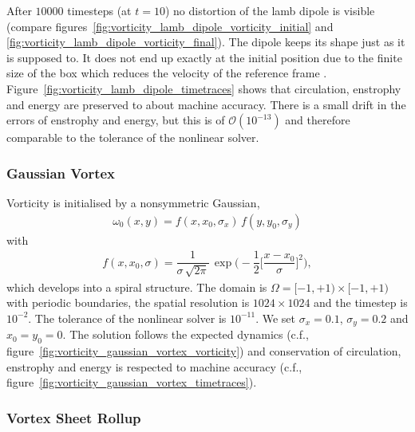 \documentclass[12pt,a4paper,reqno]{article}
\begin{document}
After $10000$ timesteps (at $t=10$) no distortion of the lamb dipole is visible (compare figures~\ref{fig:vorticity_lamb_dipole_vorticity_initial} and \ref{fig:vorticity_lamb_dipole_vorticity_final}). The dipole keeps its shape just as it is supposed to. It does not end up exactly at the initial position due to the finite size of the box which reduces the velocity of the reference frame \cite[section IV.B]{NielsenRasmussen:1997}. 
 Figure~\ref{fig:vorticity_lamb_dipole_timetraces} shows that circulation, enstrophy and energy are preserved to about machine accuracy. There is a small drift in the errors of enstrophy and energy, but this is of $\mathcal{O} (10^{-13})$ and therefore comparable to the tolerance of the nonlinear solver.

\subsubsection*{Gaussian Vortex}

Vorticity is initialised by a nonsymmetric Gaussian,
\begin{align}
\omega_{0} (x,y) = f(x, x_{0}, \sigma_{x}) \, f(y, y_{0}, \sigma_{y})
\end{align}
with
\begin{align}
f(x, x_{0}, \sigma) = \dfrac{1}{\sigma \, \sqrt{2 \pi}} \, \exp \bigg( - \dfrac{1}{2} \bigg[ \dfrac{x-x_{0}}{\sigma} \bigg]^2 \bigg) ,
\end{align}
which develops into a spiral structure.
The domain is $\Omega = [-1, +1) \times [-1, +1)$ with periodic boundaries, the spatial resolution is $1024 \times 1024$ and the timestep is $10^{-2}$. The tolerance of the nonlinear solver is $10^{-11}$. We set $\sigma_{x} = 0.1$, $\sigma_{y} = 0.2$ and $x_{0} = y_{0} = 0$.
The solution follows the expected dynamics (c.f., figure~\ref{fig:vorticity_gaussian_vortex_vorticity}) and conservation of circulation, enstrophy and energy is respected to machine accuracy (c.f., figure~\ref{fig:vorticity_gaussian_vortex_timetraces}).

\subsubsection*{Vortex Sheet Rollup}
\end{document}
